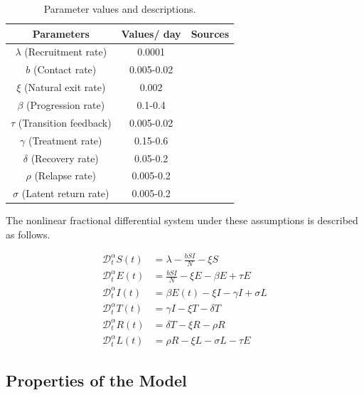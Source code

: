 \documentclass[10pt]{article}
\newcommand{\CD}{\mathcal{D}}
\begin{document}
	\begin{table}[H]
		\centering
		\caption{Parameter values and descriptions.}
		\begin{tabular}{|c|c|c|}
			\hline
			\textbf{Parameters} & \textbf{Values/ day} & \textbf{Sources} \\
			\hline
			$\lambda$ (Recruitment rate) & 0.0001 & \cite{ref25} \\
			$b$ (Contact rate) & 0.005-0.02 & \cite{ref25} \\
			$\xi$ (Natural exit rate) & 0.002 & \cite{ref25} \\
			$\beta$ (Progression rate) & 0.1-0.4 & \cite{ref25} \\
			$\tau$ (Transition feedback) & 0.005-0.02 & \cite{ref25} \\
			$\gamma$ (Treatment rate) & 0.15-0.6 & \cite{ref25} \\
			$\delta$ (Recovery rate) & 0.05-0.2 & \cite{ref25} \\
			$\rho$ (Relapse rate) & 0.005-0.2 & \cite{ref25} \\
			$\sigma$ (Latent return rate) & 0.005-0.2 & \cite{ref25} \\
			\hline
		\end{tabular}
	\end{table}
	
	The nonlinear fractional differential system under these assumptions is described as follows.
	
	\begin{equation}
		\begin{aligned}
			\CD_{t}^{\alpha} S(t) &= \lambda - \frac{b SI}{N} - \xi S \\
			\CD_{t}^{\alpha} E(t) &= \frac{b SI}{N} - \xi E - \beta E + \tau E \\
			\CD_{t}^{\alpha} I(t) &= \beta E(t) - \xi I - \gamma I + \sigma L \\
			\CD_{t}^{\alpha} T(t) &= \gamma I - \xi T - \delta T \\
			\CD_{t}^{\alpha} R(t) &= \delta T - \xi R - \rho R \\
			\CD_{t}^{\alpha} L(t) &= \rho R - \xi L - \sigma L - \tau E
		\end{aligned}
		\label{eq:system}
	\end{equation}
	
	\subsection{Properties of the Model}
	
\end{document}
